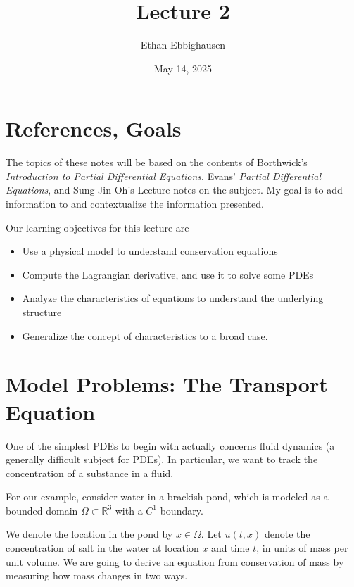 \documentclass{article}
\title{Lecture 2}
\author{Ethan Ebbighausen}
\date{May 14, 2025}
\newcommand{\R}{{\mathbb{R}}}
\begin{document}
	\pagestyle{fancy}
	\fancyfoot{} 
	
	\maketitle
	
	\section{References, Goals}
	
	The topics of these notes will be based on the contents of Borthwick's \textit{Introduction to Partial Differential Equations}, Evans' \textit{Partial Differential Equations}, and Sung-Jin Oh's Lecture notes on the subject. My goal is to add information to and contextualize the information presented. 
	
	Our learning objectives for this lecture are 
	
	\begin{itemize}
		\item Use a physical model to understand conservation equations
		\item Compute the Lagrangian derivative, and use it to solve some PDEs
		\item Analyze the characteristics of equations to understand the underlying structure
		\item Generalize the concept of characteristics to a broad case. 
	\end{itemize}
	
	\section{Model Problems: The Transport Equation}
	
	One of the simplest PDEs to begin with actually concerns fluid dynamics (a generally difficult subject for PDEs). In particular, we want to track the concentration of a substance in a fluid. 
	
	For our example, consider water in a brackish pond, which is modeled as a bounded domain $\Omega \subset \R^{3}$ with a $C^{1}$ boundary.
	
	 We denote the location in the pond by $x \in \Omega$. Let $u(t,x)$ denote the concentration of salt in the water at location $x$ and time $t$, in units of mass per unit volume. We are going to derive an equation from conservation of mass by measuring how mass changes in two ways. 
	 
\end{document}
